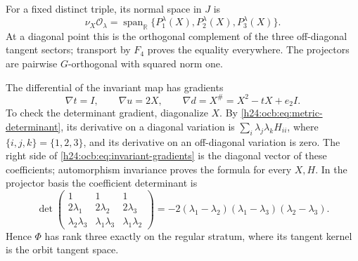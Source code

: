 For a fixed distinct triple, its normal space in $J$ is
\begin{equation}
 \nu_X\mathcal O_\lambda
 =\operatorname{span}_{\mathbb R}
     \{P_1^\lambda(X),P_2^\lambda(X),P_3^\lambda(X)\}.
 \label{h24:ocb:eq:projector-normal-space}\tag{OCB20}
\end{equation}
At a diagonal point this is the orthogonal complement of the three
off-diagonal tangent sectors; transport by $F_4$ proves the equality
everywhere. The projectors are pairwise $G$-orthogonal with squared
norm one.

The differential of the invariant map has gradients
\begin{equation}
 \nabla t=I,\qquad\nabla u=2X,\qquad
 \nabla d=X^\#=X^2-tX+e_2I.
 \label{h24:ocb:eq:invariant-gradients}\tag{OCB21}
\end{equation}
To check the determinant gradient, diagonalize $X$. By
\eqref{h24:ocb:eq:metric-determinant}, its derivative on a diagonal
variation is $\sum_i\lambda_j\lambda_k H_{ii}$, where
$\{i,j,k\}=\{1,2,3\}$, and its derivative on an off-diagonal
variation is zero. The right side of
\eqref{h24:ocb:eq:invariant-gradients} is the diagonal vector of these
coefficients; automorphism invariance proves the formula for every
$X,H$. In the projector basis the coefficient determinant is
\begin{equation}
 \det\begin{pmatrix}
 1&1&1\\2\lambda_1&2\lambda_2&2\lambda_3\\
 \lambda_2\lambda_3&\lambda_1\lambda_3&\lambda_1\lambda_2
 \end{pmatrix}
 =-2(\lambda_1-\lambda_2)(\lambda_1-\lambda_3)
                                      (\lambda_2-\lambda_3).
 \label{h24:ocb:eq:gradient-determinant}\tag{OCB22}
\end{equation}
Hence $\Phi$ has rank three exactly on the regular stratum, where
its tangent kernel is the orbit tangent space.

